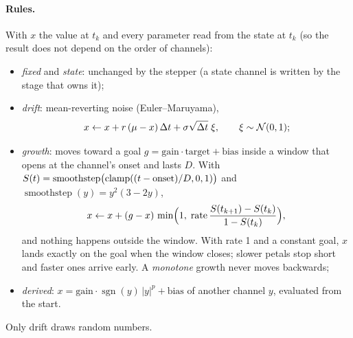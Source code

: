 \paragraph{Rules.} With $x$ the value at $t_k$ and every parameter read from the
state at $t_k$ (so the result does not depend on the order of channels):
\begin{itemize}[leftmargin=*]
\item \emph{fixed} and \emph{state}: unchanged by the stepper (a state
  channel is written by the stage that owns it);
\item \emph{drift}: mean-reverting noise (Euler--Maruyama),
  \[
    x \leftarrow x + r\,(\mu - x)\,\Delta t + \sigma\sqrt{\Delta t}\;\xi, \qquad \xi\sim\mathcal{N}(0,1);
  \]
\item \emph{growth}: moves toward a goal $g = \text{gain}\cdot\text{target} +
  \text{bias}$ inside a window that opens at the channel's onset and lasts
  $D$. With $S(t) = \operatorname{smoothstep}\bigl(\operatorname{clamp}((t - \text{onset})/D, 0, 1)\bigr)$
  and $\operatorname{smoothstep}(y) = y^2(3-2y)$,
  \[
    x \leftarrow x + (g - x)\,\min\Bigl(1,\; \text{rate}\,\frac{S(t_{k+1}) - S(t_k)}{1 - S(t_k)}\Bigr),
  \]
  and nothing happens outside the window. With rate 1 and a constant goal, $x$
  lands exactly on the goal when the window closes; slower petals stop short
  and faster ones arrive early. A \emph{monotone} growth never moves
  backwards;
\item \emph{derived}: $x = \text{gain}\cdot\operatorname{sgn}(y)\,|y|^p + \text{bias}$
  of another channel $y$, evaluated from the start.
\end{itemize}
Only drift draws random numbers.

